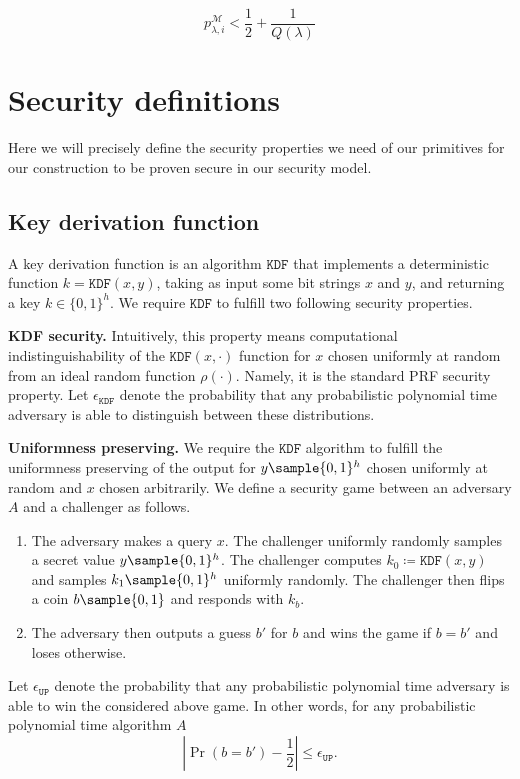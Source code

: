 \documentclass{article}
\begin{document}
$$
p_{\lambda,i}^{\mathcal M}<\frac{1}{2}+\frac{1}{Q(\lambda)}
$$

\section{Security definitions} \label{sec:def}

Here we will precisely define the security properties we need of our primitives for our construction to be proven secure in our security model.

\subsection{Key derivation function} \label{KDFdef}
A key derivation function is an algorithm $\texttt{KDF}$ that implements a deterministic function $k=\texttt{KDF}(x, y)$, taking as input some bit strings $x$ and $y$, and returning a key $k \in \{0,1\}^h$. We require $\texttt{KDF}$ to fulfill two following security properties. 

\textbf{KDF security.} Intuitively, this property means computational indistinguishability of the $\texttt{KDF}(x,\cdot)$ function for $x$ chosen uniformly at random from an ideal random function $\rho(\cdot)$. Namely, it is the standard PRF security property. Let $\epsilon_{\texttt{KDF}}$ denote the probability that any probabilistic polynomial time adversary is able to distinguish between these distributions.

\textbf{Uniformness preserving.} We require the $\texttt{KDF}$ algorithm to fulfill the uniformness preserving of the output for $y \sample \{0,1\}^h$ chosen uniformly at random and $x$ chosen arbitrarily. 
We define a security game between an adversary $A$ and a challenger as follows.

\begin{enumerate}
	\item The adversary makes a query $x$. The challenger uniformly randomly samples a secret value $y \sample \{0,1\}^h$. The challenger computes $k_0 \coloneqq \texttt{KDF}(x,y)$ and samples $k_1 \sample \{0,1\}^h$ uniformly randomly. The challenger then flips a coin $b \sample \{0, 1\}$ and responds with $k_b$.
	
	\item The adversary then outputs a guess $b'$ for $b$ and wins the game if $b = b'$ and loses otherwise.
\end{enumerate}

Let $\epsilon_{\texttt{UP}}$ denote the probability that any probabilistic polynomial time adversary is able to win the considered above game. In other words, for any probabilistic polynomial time algorithm $A$	
$$
\left \vert \Pr(b = b') - \frac{1}{2} \right \vert \le \epsilon_{\texttt{UP}}.
$$
\end{document}
